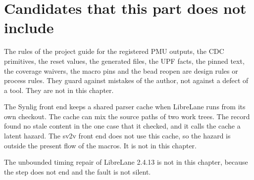 \section{Candidates that this part does not include}\label{tm:ch:tool-defects:dropped}
The rules of the project guide for the registered PMU outputs, the CDC primitives, the reset values, the generated files, the UPF facts, the pinned text, the coverage waivers, the macro pins and the bead reopen are design rules or process rules. They guard against mistakes of the author, not against a defect of a tool. They are not in this chapter.

The Synlig front end keeps a shared parser cache when LibreLane runs from its own checkout. The cache can mix the source paths of two work trees. The record found no stale content in the one case that it checked, and it calls the cache a latent hazard. The sv2v front end does not use this cache, so the hazard is outside the present flow of the macros. It is not in this chapter.

The unbounded timing repair of LibreLane 2.4.13 is not in this chapter, because the step does not end and the fault is not silent.
